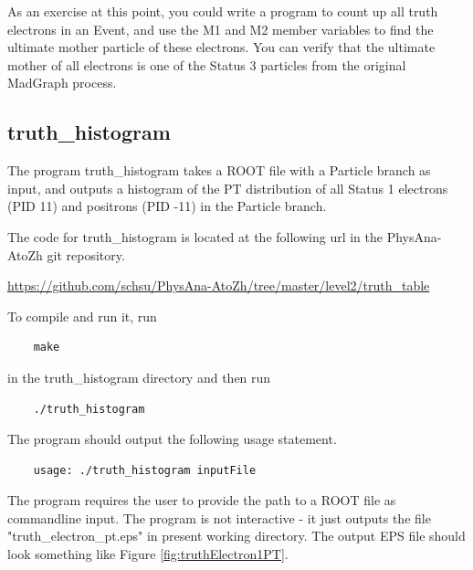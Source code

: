 \documentclass{article}
\begin{document}
As an exercise at this point, you could write a program to count up all truth electrons in an Event,
and use the M1 and M2 member variables to find the ultimate mother particle of these electrons. You can
verify that the ultimate mother of all electrons is one of the Status 3 particles from the original MadGraph process.

\subsection{truth\_histogram}

The program truth\_histogram takes a ROOT file with a Particle branch as input, and outputs a histogram
of the PT distribution of all Status 1 electrons (PID 11) and positrons (PID -11) in the Particle branch.

\bigskip

The code for truth\_histogram is located at the following url in the PhysAna-AtoZh git repository.

\bigskip

\url{https://github.com/schsu/PhysAna-AtoZh/tree/master/level2/truth_table}

\bigskip

To compile and run it, run

\begin{verbatim}
	make
\end{verbatim} 

in the truth\_histogram directory and then run

\begin{verbatim}
	./truth_histogram
\end{verbatim}

The program should output the following usage statement.

\begin{verbatim}
	usage: ./truth_histogram inputFile
\end{verbatim}

The program requires the user to provide the path to a ROOT file as commandline input.
The program is not interactive - it just outputs the file "truth\_electron\_pt.eps" in
present working directory. The output EPS file should look something like Figure \ref{fig:truthElectron1PT}.
\end{document}
